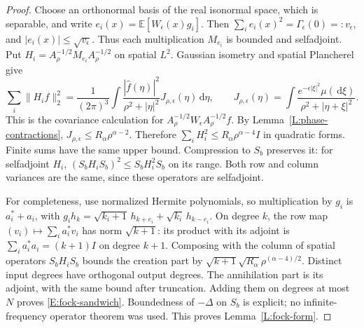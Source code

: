 \documentclass[12pt]{article}
\numberwithin{equation}{section}
\theoremstyle{definition}
\newcommand{\E}{\mathbb{E}}
\newcommand{\ud}{\,\mathrm{d}}
\begin{document}
\begin{proof}
  Choose an orthonormal basis of the real isonormal space, which is
  separable, and write $e_i(x)=\E[W_\epsilon(x)g_i]$.
  Then $\sum_i e_i(x)^2=\Gamma_\epsilon(0)=:v_\epsilon$, and
  $|e_i(x)|\le\sqrt{v_\epsilon}$. Thus each multiplication $M_{e_i}$
  is bounded and selfadjoint. Put
  $H_i=A_\rho^{-1/2}M_{e_i}A_\rho^{-1/2}$ on spatial $L^2$.
  Gaussian isometry and spatial Plancherel give
  \[
    \sum_i\|H_i f\|_2^2
    =\frac1{(2\pi)^3}\int
    \frac{|\widehat f(\eta)|^2}{\rho^2+|\eta|^2}
    J_{\rho,\epsilon}(\eta)\ud\eta,\qquad
    J_{\rho,\epsilon}(\eta)
    =\int\frac{e^{-\epsilon|\xi|^2}\mu(\ud\xi)}
    {\rho^2+|\eta+\xi|^2}.
  \]
  This is the covariance calculation for
  $A_\rho^{-1/2}W_\epsilon A_\rho^{-1/2}f$.
  By Lemma~\ref{L:phase-contractions},
  $J_{\rho,\epsilon}\le R_\alpha\rho^{\alpha-2}$.
  Therefore
  $\sum_i H_i^2\le R_\alpha\rho^{\alpha-4}I$
  in quadratic forms. Finite sums have the same upper bound.
  Compression to $S_b$ preserves it: for selfadjoint $H_i$,
  $(S_bH_iS_b)^2\le S_bH_i^2S_b$ on its range.
  Both row and column variances are the same, since these
  operators are selfadjoint.

  For completeness, use normalized Hermite polynomials, so multiplication
  by $g_i$ is $a_i^*+a_i$, with
  $g_i h_k=\sqrt{k_i+1}\,h_{k+e_i}+\sqrt{k_i}\,h_{k-e_i}$.
  On degree $k$, the row map $(v_i)\mapsto\sum_i a_i^*v_i$
  has norm $\sqrt{k+1}$: its product with its adjoint is
  $\sum_i a_i^*a_i=(k+1)I$ on degree $k+1$.
  Composing with the column of spatial operators $S_bH_iS_b$ bounds
  the creation part by
  $\sqrt{k+1}\sqrt{R_\alpha}\rho^{(\alpha-4)/2}$.
  Distinct input degrees have orthogonal output degrees.
  The annihilation part is its adjoint, with the same bound after
  truncation. Adding them on degrees at most $N$ proves
  \eqref{E:fock-sandwich}. Boundedness of $-\Delta$ on $S_b$ is explicit;
  no infinite-frequency operator theorem was used.
  This proves Lemma~\ref{L:fock-form}.
\end{proof}
\end{document}
